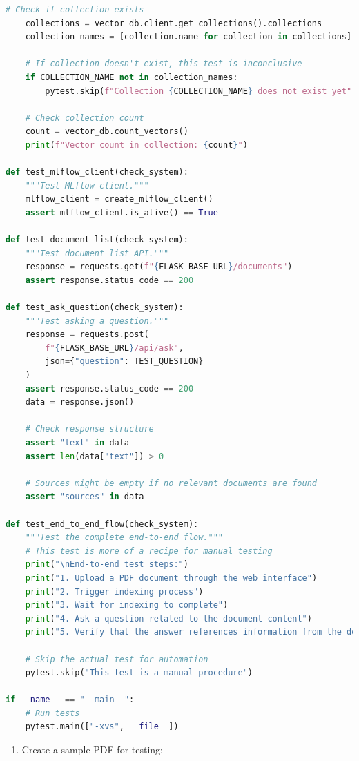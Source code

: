\documentclass[
  screen,review,acmlarge]{acmart}
\providecommand{\tightlist}{%
  \setlength{\itemsep}{0pt}\setlength{\parskip}{0pt}}
\begin{document}
\begin{lstlisting}[language=Python]
    # Check if collection exists
    collections = vector_db.client.get_collections().collections
    collection_names = [collection.name for collection in collections]
    
    # If collection doesn't exist, this test is inconclusive
    if COLLECTION_NAME not in collection_names:
        pytest.skip(f"Collection {COLLECTION_NAME} does not exist yet")
    
    # Check collection count
    count = vector_db.count_vectors()
    print(f"Vector count in collection: {count}")

def test_mlflow_client(check_system):
    """Test MLflow client."""
    mlflow_client = create_mlflow_client()
    assert mlflow_client.is_alive() == True

def test_document_list(check_system):
    """Test document list API."""
    response = requests.get(f"{FLASK_BASE_URL}/documents")
    assert response.status_code == 200

def test_ask_question(check_system):
    """Test asking a question."""
    response = requests.post(
        f"{FLASK_BASE_URL}/api/ask",
        json={"question": TEST_QUESTION}
    )
    assert response.status_code == 200
    data = response.json()
    
    # Check response structure
    assert "text" in data
    assert len(data["text"]) > 0
    
    # Sources might be empty if no relevant documents are found
    assert "sources" in data

def test_end_to_end_flow(check_system):
    """Test the complete end-to-end flow."""
    # This test is more of a recipe for manual testing
    print("\nEnd-to-end test steps:")
    print("1. Upload a PDF document through the web interface")
    print("2. Trigger indexing process")
    print("3. Wait for indexing to complete")
    print("4. Ask a question related to the document content")
    print("5. Verify that the answer references information from the document")
    
    # Skip the actual test for automation
    pytest.skip("This test is a manual procedure")

if __name__ == "__main__":
    # Run tests
    pytest.main(["-xvs", __file__])
\end{lstlisting}

\begin{enumerate}
\def\labelenumi{\arabic{enumi}.}
\setcounter{enumi}{2}
\tightlist
\item
  Create a sample PDF for testing:
\end{enumerate}
\end{document}
